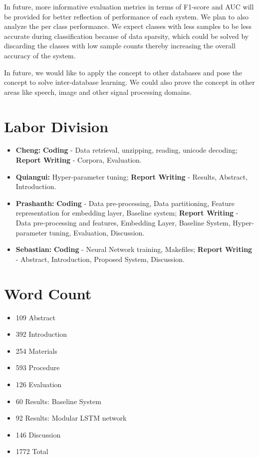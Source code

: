 \documentclass[12pt]{article}
\begin{document}
In future, more informative evaluation metrics in terms of F1-score and AUC will be provided for better reflection of performance of each system. We plan to also analyze the per class performance. We expect classes with less samples to be less accurate during classification because of data sparsity, which could be solved by discarding the classes with low sample counts thereby increasing the overall accuracy of the system. 

In future, we would like to apply the concept to other databases and pose the concept to solve inter-database learning. We could also prove the concept in other areas like speech, image and other signal processing domains.

 


\newpage
\section{Labor Division}
\begin{itemize}
\item
  \textbf{Cheng:} \textbf{Coding} - Data retrieval, unzipping, reading, unicode decoding; \textbf{Report Writing} - Corpora, Evaluation.
\item
  \textbf{Quiangui:} Hyper-parameter tuning; \textbf{Report Writing} - Results, Abstract, Introduction.
\item
  \textbf{Prashanth:} \textbf{Coding} - Data pre-processing, Data partitioning,  Feature representation for embedding layer, Baseline system; \textbf{Report Writing} - Data pre-processing and features, Embedding Layer, Baseline System, Hyper-parameter tuning, Evaluation, Discussion.
\item
  \textbf{Sebastian:} \textbf{Coding} - Neural Network training, Makefiles; \textbf{Report Writing} - Abstract, Introduction, Proposed System, Discussion.
\end{itemize}
\section{Word Count}
\begin{itemize}
\item
109 Abstract
\item
392 Introduction
\item
254 Materials
\item
593 Procedure
\item
126 Evaluation
\item
60 Results: Baseline System
\item
92 Results: Modular LSTM network
\item
146 Discussion
\item
1772 Total
\end{itemize}
\end{document}
